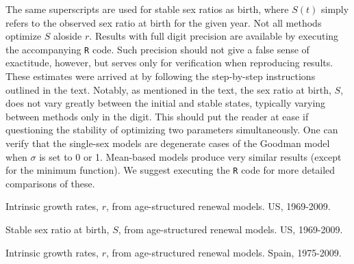 The same superscripts are used for stable sex ratios as birth, where $S(t)$
simply refers to the observed sex ratio at birth for the given year. Not
all methods optimize $S$ aloside $r$. Results with full digit precision are
available by executing the accompanying \texttt{R} code. Such precision 
should not give a false sense of exactitude, however, but
serves only for verification when reproducing results. These estimates were
arrived at by following the step-by-step instructions outlined in the text.
Notably, as mentioned in the text, the sex ratio at birth, $S$, does not vary
greatly between the initial and stable states, typically varying between
methods only in the  digit. This should put the reader at ease if
questioning the stability of optimizing two parameters simultaneously. One can
verify that the single-sex models are degenerate cases of the Goodman model when
$\sigma$ is set to 0 or 1. Mean-based models produce very similar results
(except for the minimum function). We suggest executing the \texttt{R} code for
more detailed comparisons of these.

\begin{landscape}
\begin{table}
  \begin{adjustwidth}{-1in}{-.5in}
  \centering
    \caption{Intrinsic growth rates, $r$, from age-structured renewal models.
    US, 1969-2009.}
    \label{tab:USageALL}
        \scriptsize{}
  \end{adjustwidth}
\end{table}

\end{landscape}
\begin{landscape}
\begin{table}
  \begin{adjustwidth}{-1in}{-.5in}
  \centering
    \caption{Stable sex ratio at birth, $S$, from age-structured renewal
    models. US, 1969-2009.}
    \label{tab:USageSRBALL}
        \scriptsize{}
  \end{adjustwidth}
\end{table}
\end{landscape}

\begin{landscape}
\begin{table}
  \begin{adjustwidth}{-1in}{-.5in}
  \centering
    \caption{Intrinsic growth rates, $r$, from age-structured renewal models.
    Spain, 1975-2009.}
    \label{tab:ESageALL}
        \scriptsize{}
  \end{adjustwidth}
\end{table}
\end{landscape}

